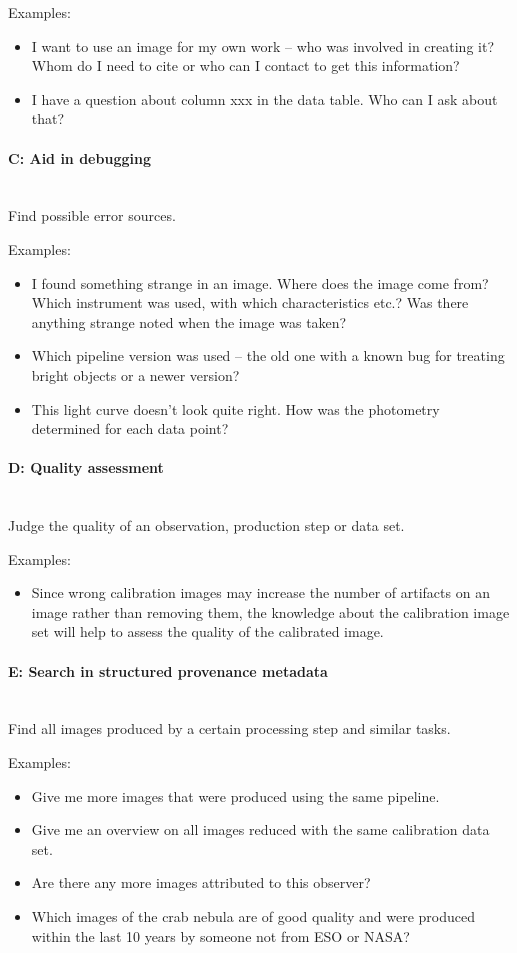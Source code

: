 \documentclass[11pt,a4paper]{ivoa}
\newcommand{\paragraphlb}[1]{\paragraph{#1}\mbox{}\\} %
\begin{document}
        \noindent Examples: 
        \begin{itemize}
            \item I want to use an image for my own work -- who was involved in
creating it? Whom do I need to cite or who can I contact to get this information?  
            \item I have a question about column xxx in the data
table. Who can I ask about that?  
        \end{itemize}
      

\paragraphlb{C: Aid in debugging}
        Find possible error sources.

        \noindent Examples:
        \begin{itemize}
            \item I found something strange in an image. Where does
the image come from? Which instrument was used, with which characteristics
etc.? Was there anything strange noted when the image was taken?  
            \item Which pipeline version was used -- the old one
with a known bug for treating bright objects or a newer version?  
            \item This light curve doesn't look quite right. How was
the photometry determined for each data point?  
        \end{itemize}


\paragraphlb{D: Quality assessment}
        Judge the quality of an observation, production step or data set.
        
        \noindent Examples:
        \begin{itemize}
            \item Since wrong calibration images may increase the
number of artifacts on an image rather than removing them, the knowledge about
the calibration image set will help to assess the quality of the calibrated
image.  
        \end{itemize}
      

\paragraphlb{E: Search in structured provenance metadata}
        Find all images produced by a certain processing step and similar tasks.
        
        \noindent Examples:
        \begin{itemize}
            \item Give me more images that were produced using the
same pipeline.  
            \item Give me an overview on all images reduced with the same calibration data set.  
            \item Are there any more images attributed to this observer?  
            \item Which images of the crab nebula are of good quality and were produced within the last 10 years by someone not from ESO or NASA?  
        \end{itemize}
\end{document}
